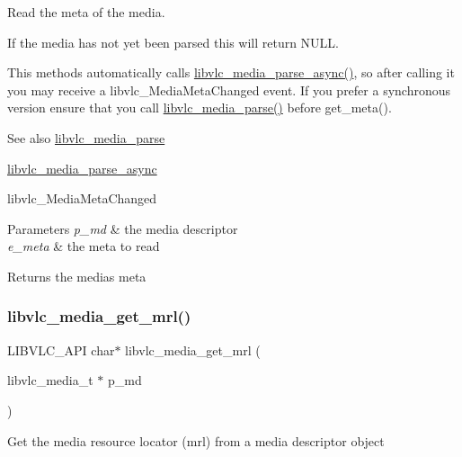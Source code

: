 Read the meta of the media.

If the media has not yet been parsed this will return N\+U\+LL.

This methods automatically calls \hyperlink{group__libvlc__media_gada166e6385518f9d5826c2dce647a475}{libvlc\+\_\+media\+\_\+parse\+\_\+async()}, so after calling it you may receive a libvlc\+\_\+\+Media\+Meta\+Changed event. If you prefer a synchronous version ensure that you call \hyperlink{group__libvlc__media_gad9e48150dcb1a066c51688f6e4a216f1}{libvlc\+\_\+media\+\_\+parse()} before get\+\_\+meta().

\begin{DoxySeeAlso}{See also}
\hyperlink{group__libvlc__media_gad9e48150dcb1a066c51688f6e4a216f1}{libvlc\+\_\+media\+\_\+parse} 

\hyperlink{group__libvlc__media_gada166e6385518f9d5826c2dce647a475}{libvlc\+\_\+media\+\_\+parse\+\_\+async} 

libvlc\+\_\+\+Media\+Meta\+Changed
\end{DoxySeeAlso}

\begin{DoxyParams}{Parameters}
{\em p\+\_\+md} & the media descriptor \\
\hline
{\em e\+\_\+meta} & the meta to read \\
\hline
\end{DoxyParams}
\begin{DoxyReturn}{Returns}
the media\textquotesingle{}s meta 
\end{DoxyReturn}
\mbox{\label{group__libvlc__media_ga88cd51e19ac7848bb15352eeddd32b9c}} 
\subsubsection{\texorpdfstring{libvlc\+\_\+media\+\_\+get\+\_\+mrl()}{libvlc\_media\_get\_mrl()}}
{\footnotesize\ttfamily L\+I\+B\+V\+L\+C\+\_\+\+A\+PI char$\ast$ libvlc\+\_\+media\+\_\+get\+\_\+mrl (\begin{DoxyParamCaption}\item[{libvlc\+\_\+media\+\_\+t $\ast$}]{p\+\_\+md }\end{DoxyParamCaption})}

Get the media resource locator (mrl) from a media descriptor object



